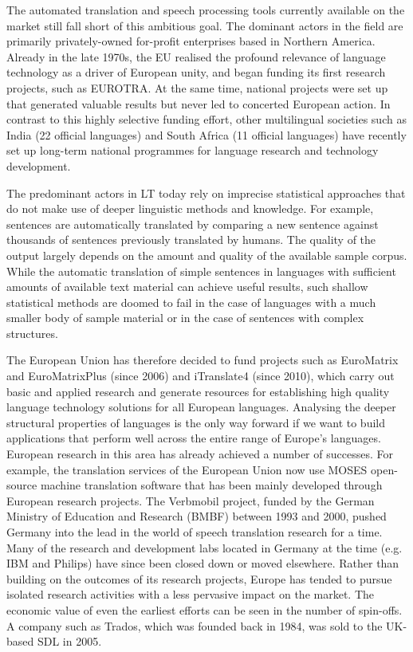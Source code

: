 \begin{multicols}{2}
\begin{itemize}
\begin{multicols}{2}
    The automated translation and speech processing tools currently available on the market still fall short of this ambitious goal. The dominant actors in the field are primarily privately-owned for-profit enterprises based in Northern America. Already in the late 1970s, the EU realised the profound relevance of language technology as a driver of European unity, and began funding its first research projects, such as EUROTRA. At the same time, national projects were set up that generated valuable results but never led to concerted European action. In contrast to this highly selective funding effort, other multilingual societies such as India (22 official languages) and South Africa (11 official languages) have recently set up long-term national programmes for language research and technology development. 

    The predominant actors in LT today rely on imprecise statistical approaches that do not make use of deeper linguistic methods and knowledge. For example, sentences are automatically translated by comparing a new sentence against thousands of sentences previously translated by humans. The quality of the output largely depends on the amount and quality of the available sample corpus. While the automatic translation of simple sentences in languages with sufficient amounts of available text material can achieve useful results, such shallow statistical methods are doomed to fail in the case of languages with a much smaller body of sample material or in the case of sentences with complex structures.


    The European Union has therefore decided to fund projects such as EuroMatrix and EuroMatrixPlus (since 2006) and iTranslate4 (since 2010), which carry out basic and applied research and generate resources for establishing high quality language technology solutions for all European languages. Analysing the deeper structural properties of languages is the only way forward if we want to build applications that perform well across the entire range of Europe’s languages.
    European research in this area has already achieved a number of successes. For example, the translation services of the European Union now use MOSES open-source machine translation software that has been mainly developed through European research projects. The Verbmobil project, funded by the German Ministry of Education and Research (BMBF) between 1993 and 2000, pushed Germany into the lead in the world of speech translation research for a time. Many of the research and development labs located in Germany at the time (e.g. IBM and Philips) have since been closed down or moved elsewhere. Rather than building on the outcomes of its research projects, Europe has tended to pursue isolated research activities with a less pervasive impact on the market. The economic value of even the earliest efforts can be seen in the number of spin-offs. A company such as Trados, which was founded back in 1984, was sold to the UK-based SDL in 2005.


\end{multicols}
\end{itemize}
\end{multicols}
